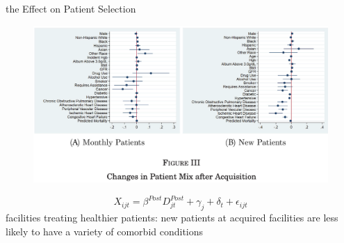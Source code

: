 \begin{frame}{the Effect on Patient Selection}
    \begin{figure}
        \centering
        \includegraphics[width=0.8\linewidth]{fig3.png}
    \end{figure}
    $$X_{ijt} = \beta^{Post}D^{Post}_{jt}+\gamma_j+\delta_t+\epsilon_{ijt} $$
    facilities treating healthier patients: new patients at acquired facilities are less likely to have a variety of comorbid conditions

\end{frame}